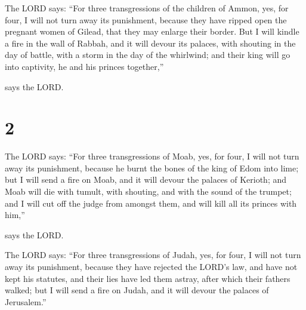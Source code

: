  The LORD says: ``For three transgressions of the children
of Ammon, yes, for four, I will not turn away its punishment, because
they have ripped open the pregnant women of Gilead, that they may
enlarge their border.  But I will kindle a fire in the wall
of Rabbah, and it will devour its palaces, with shouting in the day of
battle, with a storm in the day of the whirlwind;  and
their king will go into captivity, he and his princes together,''

says the LORD.

\hypertarget{section-1}{%
\section{2}\label{section-1}}

 The LORD says: ``For three transgressions of Moab, yes, for
four, I will not turn away its punishment, because he burnt the bones of
the king of Edom into lime;  but I will send a fire on Moab,
and it will devour the palaces of Kerioth; and Moab will die with
tumult, with shouting, and with the sound of the trumpet; 
and I will cut off the judge from amongst them, and will kill all its
princes with him,''

says the LORD.

 The LORD says: ``For three transgressions of Judah, yes,
for four, I will not turn away its punishment, because they have
rejected the LORD's law, and have not kept his statutes, and their lies
have led them astray, after which their fathers walked;  but
I will send a fire on Judah, and it will devour the palaces of
Jerusalem.''

